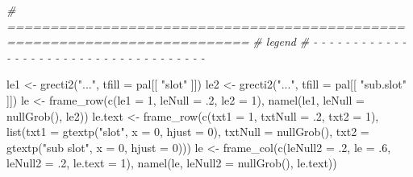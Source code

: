\documentclass[
]{article}
\newenvironment{Shaded}{\begin{snugshade}}{\end{snugshade}}
\newcommand{\AttributeTok}[1]{\textcolor[rgb]{0.77,0.63,0.00}{#1}}
\newcommand{\CommentTok}[1]{\textcolor[rgb]{0.56,0.35,0.01}{\textit{#1}}}
\newcommand{\DecValTok}[1]{\textcolor[rgb]{0.00,0.00,0.81}{#1}}
\newcommand{\FunctionTok}[1]{\textcolor[rgb]{0.00,0.00,0.00}{#1}}
\newcommand{\NormalTok}[1]{#1}
\newcommand{\OtherTok}[1]{\textcolor[rgb]{0.56,0.35,0.01}{#1}}
\newcommand{\StringTok}[1]{\textcolor[rgb]{0.31,0.60,0.02}{#1}}
\begin{document}
\begin{Shaded}
\begin{Highlighting}[]
\CommentTok{\# ==========================================================================}
\CommentTok{\# legend}
\CommentTok{\# {-} {-} {-} {-} {-} {-} {-} {-} {-} {-} {-} {-} {-} {-} {-} {-} {-} {-} {-} {-} {-} {-} {-} {-} {-} {-} {-} {-} {-} {-} {-} {-} {-} {-} {-} {-} {-}}

\NormalTok{le1 }\OtherTok{\textless{}{-}} \FunctionTok{grecti2}\NormalTok{(}\StringTok{"..."}\NormalTok{, }\AttributeTok{tfill =}\NormalTok{ pal[[ }\StringTok{"slot"}\NormalTok{ ]])}
\NormalTok{le2 }\OtherTok{\textless{}{-}} \FunctionTok{grecti2}\NormalTok{(}\StringTok{"..."}\NormalTok{, }\AttributeTok{tfill =}\NormalTok{ pal[[ }\StringTok{"sub.slot"}\NormalTok{ ]])}
\NormalTok{le }\OtherTok{\textless{}{-}} \FunctionTok{frame\_row}\NormalTok{(}\FunctionTok{c}\NormalTok{(}\AttributeTok{le1 =} \DecValTok{1}\NormalTok{, }\AttributeTok{leNull =}\NormalTok{ .}\DecValTok{2}\NormalTok{, }\AttributeTok{le2 =} \DecValTok{1}\NormalTok{),}
                \FunctionTok{namel}\NormalTok{(le1, }\AttributeTok{leNull =} \FunctionTok{nullGrob}\NormalTok{(), le2))}
\NormalTok{le.text }\OtherTok{\textless{}{-}} \FunctionTok{frame\_row}\NormalTok{(}\FunctionTok{c}\NormalTok{(}\AttributeTok{txt1 =} \DecValTok{1}\NormalTok{, }\AttributeTok{txtNull =}\NormalTok{ .}\DecValTok{2}\NormalTok{, }\AttributeTok{txt2 =} \DecValTok{1}\NormalTok{),}
                     \FunctionTok{list}\NormalTok{(}\AttributeTok{txt1 =} \FunctionTok{gtextp}\NormalTok{(}\StringTok{"slot"}\NormalTok{, }\AttributeTok{x =} \DecValTok{0}\NormalTok{, }\AttributeTok{hjust =} \DecValTok{0}\NormalTok{),}
                          \AttributeTok{txtNull =} \FunctionTok{nullGrob}\NormalTok{(),}
                          \AttributeTok{txt2 =} \FunctionTok{gtextp}\NormalTok{(}\StringTok{"sub slot"}\NormalTok{, }\AttributeTok{x =} \DecValTok{0}\NormalTok{, }\AttributeTok{hjust =} \DecValTok{0}\NormalTok{)))}
\NormalTok{le }\OtherTok{\textless{}{-}} \FunctionTok{frame\_col}\NormalTok{(}\FunctionTok{c}\NormalTok{(}\AttributeTok{leNull2 =}\NormalTok{ .}\DecValTok{2}\NormalTok{, }\AttributeTok{le =}\NormalTok{ .}\DecValTok{6}\NormalTok{, }\AttributeTok{leNull2 =}\NormalTok{ .}\DecValTok{2}\NormalTok{, }\AttributeTok{le.text =} \DecValTok{1}\NormalTok{),}
                \FunctionTok{namel}\NormalTok{(le, }\AttributeTok{leNull2 =} \FunctionTok{nullGrob}\NormalTok{(), le.text))}


\end{Highlighting}
\end{Shaded}
\end{document}
